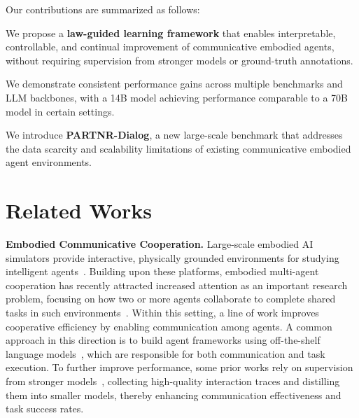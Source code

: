 \documentclass{article}
\theoremstyle{plain}
\theoremstyle{definition}
\theoremstyle{remark}
\begin{document}
Our contributions are summarized as follows:

\noindent\textbullet{} We propose a \textbf{law-guided learning framework} that enables interpretable, controllable, and continual improvement of communicative embodied agents, without requiring supervision from stronger models or ground-truth annotations.

\noindent\textbullet{} We demonstrate consistent performance gains across multiple benchmarks and LLM backbones, with a 14B model achieving performance comparable to a 70B model in certain settings.

\noindent\textbullet{} We introduce \textbf{PARTNR-Dialog}, a new large-scale benchmark that addresses the data scarcity and scalability limitations of existing communicative embodied agent environments.

\section{Related Works}

\textbf{Embodied Communicative Cooperation.} Large-scale embodied AI simulators provide interactive, physically grounded environments for studying intelligent agents~\cite{deepmind-lab, house3d, xiang2020sapien, li2024behavior1k, virtualhome, ai2thor, chalet, isaacgym}. 
Building upon these platforms, embodied multi-agent cooperation has recently attracted increased attention as an important research problem, focusing on how two or more agents collaborate to complete shared tasks in such environments~\cite{habitat3, partnr, wah, jain2020cordial, szot2023adaptive, zhang2024proagent, zhang2024towards, zhang2024combo, chen2024scalable, zhou2025virtualcommunityopenworld}. Within this setting, a line of work improves cooperative efficiency by enabling communication among agents. 
A common approach in this direction is to build agent frameworks using off-the-shelf language models~\cite{roco, nayak2024long, capo, cots, ling2025elhplan, li2025learn, comm-partnr}, which are responsible for both communication and task execution. To further improve performance, some prior works rely on supervision from stronger models~\cite{coela, partnr}, collecting high-quality interaction traces and distilling them into smaller models, thereby enhancing communication effectiveness and task success rates.
\end{document}
